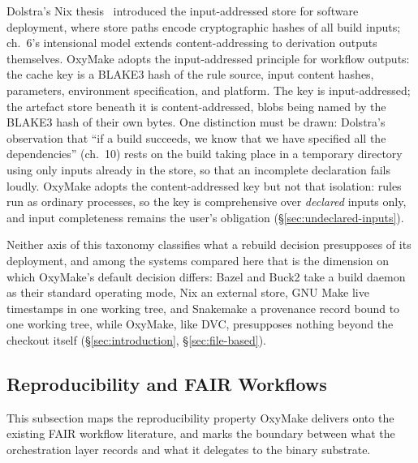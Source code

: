 \documentclass[12pt,a4paper]{article}
\begin{document}
Dolstra's Nix thesis~\cite[ch.~5]{dolstraPurelyFunctionalSoftware2006} introduced
the input-addressed store for software deployment, where store paths encode
cryptographic hashes of all build inputs; ch.~6's intensional model extends
content-addressing to derivation outputs themselves. OxyMake adopts the
input-addressed principle for
workflow outputs: the cache key is a BLAKE3 hash of the rule source, input
content hashes, parameters, environment specification, and platform. The
key is input-addressed; the artefact store beneath it is content-addressed,
blobs being named by the BLAKE3 hash of their own bytes. One
distinction must be drawn: Dolstra's observation that ``if a build
succeeds, we know that we have specified all the dependencies''
(ch.~10) rests on the build taking place in a temporary directory using
only inputs already in the store, so that an incomplete declaration
fails loudly. OxyMake adopts the
content-addressed key but not that isolation: rules run as ordinary
processes, so the key is comprehensive over \emph{declared} inputs only,
and input completeness remains the user's obligation
(\S\ref{sec:undeclared-inputs}).

Neither axis of this taxonomy classifies what a rebuild decision
presupposes of its deployment, and among the systems compared here that
is the dimension on which OxyMake's default decision differs: Bazel and
Buck2 take a build daemon as their standard operating mode, Nix an
external store, GNU Make live timestamps in one working tree, and
Snakemake a provenance record bound to one working tree, while OxyMake, like DVC, presupposes nothing beyond the checkout
itself (\S\ref{sec:introduction}, \S\ref{sec:file-based}).

\subsection{Reproducibility and FAIR Workflows}
\label{sec:fair}

This subsection maps the
reproducibility property OxyMake delivers onto the existing FAIR workflow
literature, and marks the boundary between what the orchestration layer
records and what it delegates to the binary substrate.
\end{document}
